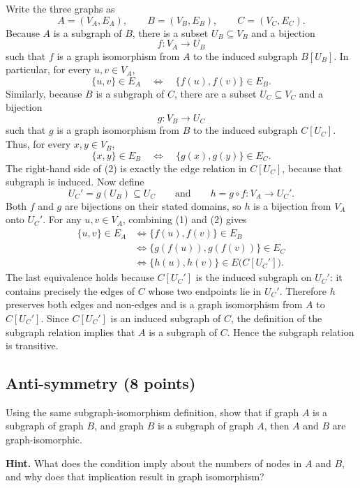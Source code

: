 \begin{solution}
Write the three graphs as
\[
  A=(V_A,E_A),\qquad B=(V_B,E_B),\qquad C=(V_C,E_C).
\]
Because \(A\) is a subgraph of \(B\), there is a subset
\(U_B\subseteq V_B\) and a bijection
\[
  f:V_A\longrightarrow U_B
\]
such that \(f\) is a graph isomorphism from \(A\) to the induced subgraph
\(B[U_B]\).  In particular, for every \(u,v\in V_A\),
\[
  \{u,v\}\in E_A
  \quad\Longleftrightarrow\quad
  \{f(u),f(v)\}\in E_B.
  \tag{1}
\]
Similarly, because \(B\) is a subgraph of \(C\), there are a subset
\(U_C\subseteq V_C\) and a bijection
\[
  g:V_B\longrightarrow U_C
\]
such that \(g\) is a graph isomorphism from \(B\) to the induced subgraph
\(C[U_C]\).  Thus, for every \(x,y\in V_B\),
\[
  \{x,y\}\in E_B
  \quad\Longleftrightarrow\quad
  \{g(x),g(y)\}\in E_C.
  \tag{2}
\]
The right-hand side of (2) is exactly the edge relation in \(C[U_C]\),
because that subgraph is induced.
Now define
\[
  U_C'=g(U_B)\subseteq U_C
  \qquad\text{and}\qquad
  h=g\circ f:V_A\longrightarrow U_C'.
\]
Both \(f\) and \(g\) are bijections on their stated domains, so \(h\) is a
bijection from \(V_A\) onto \(U_C'\).  For any \(u,v\in V_A\), combining
(1) and (2) gives
\[
\begin{aligned}
  \{u,v\}\in E_A
  &\Longleftrightarrow \{f(u),f(v)\}\in E_B\\
  &\Longleftrightarrow \{g(f(u)),g(f(v))\}\in E_C\\
  &\Longleftrightarrow \{h(u),h(v)\}\in E\bigl(C[U_C']\bigr).
\end{aligned}
\]
The last equivalence holds because \(C[U_C']\) is the induced subgraph on
\(U_C'\): it contains precisely the edges of \(C\) whose two endpoints lie
in \(U_C'\).  Therefore \(h\) preserves both edges and non-edges and is a
graph isomorphism from \(A\) to \(C[U_C']\).
Since \(C[U_C']\) is an induced subgraph of \(C\), the definition of the
subgraph relation implies that \(A\) is a subgraph of \(C\).  Hence the
subgraph relation is transitive.
\end{solution}

\subsection{Anti-symmetry (8 points)}

Using the same subgraph-isomorphism definition, show that if graph \(A\) is a
subgraph of graph \(B\), and graph \(B\) is a subgraph of graph \(A\), then
\(A\) and \(B\) are graph-isomorphic.

\textbf{Hint.} What does the condition imply about the numbers of nodes in
\(A\) and \(B\), and why does that implication result in graph isomorphism?

